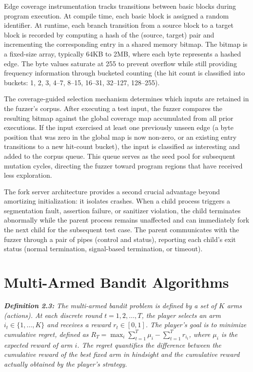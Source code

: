 Edge coverage instrumentation tracks transitions between basic blocks during program execution. At compile time, each basic block is assigned a random identifier. At runtime, each branch transition from a source block to a target block is recorded by computing a hash of the (source, target) pair and incrementing the corresponding entry in a shared memory bitmap. The bitmap is a fixed-size array, typically 64KB to 2MB, where each byte represents a hashed edge. The byte values saturate at 255 to prevent overflow while still providing frequency information through bucketed counting (the hit count is classified into buckets: 1, 2, 3, 4--7, 8--15, 16--31, 32--127, 128--255).

The coverage-guided selection mechanism determines which inputs are retained in the fuzzer's corpus. After executing a test input, the fuzzer compares the resulting bitmap against the global coverage map accumulated from all prior executions. If the input exercised at least one previously unseen edge (a byte position that was zero in the global map is now non-zero, or an existing entry transitions to a new hit-count bucket), the input is classified as interesting and added to the corpus queue. This queue serves as the seed pool for subsequent mutation cycles, directing the fuzzer toward program regions that have received less exploration.

The fork server architecture provides a second crucial advantage beyond amortizing initialization: it isolates crashes. When a child process triggers a segmentation fault, assertion failure, or sanitizer violation, the child terminates abnormally while the parent process remains unaffected and can immediately fork the next child for the subsequent test case. The parent communicates with the fuzzer through a pair of pipes (control and status), reporting each child's exit status (normal termination, signal-based termination, or timeout).

\section{Multi-Armed Bandit Algorithms}
\label{sec:bg-bandit}

\textbf{\textit{Definition 2.3:}} \textit{The multi-armed bandit problem is defined by a set of $K$ arms (actions). At each discrete round $t = 1, 2, \ldots, T$, the player selects an arm $i_t \in \{1, \ldots, K\}$ and receives a reward $r_t \in [0, 1]$. The player's goal is to minimize cumulative regret, defined as $R_T = \max_{i} \sum_{t=1}^{T} \mu_i - \sum_{t=1}^{T} r_{i_t}$, where $\mu_i$ is the expected reward of arm $i$. The regret quantifies the difference between the cumulative reward of the best fixed arm in hindsight and the cumulative reward actually obtained by the player's strategy.}

